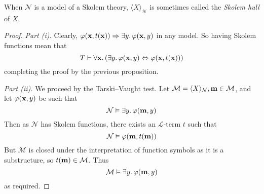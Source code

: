 \begin{remark}
    When \( \mathcal N \) is a model of a Skolem theory, \( \langle X \rangle_{\mathcal N} \) is sometimes called the \emph{Skolem hull} of \( X \).
\end{remark}
\begin{proof}
    \emph{Part (i).}
    Clearly, \( \varphi(\vb x, t(\vb x)) \Rightarrow \exists y.\, \varphi(\vb x, y) \) in any model.
    So having Skolem functions mean that
    \[ T \vdash \forall \vb x.\, (\exists y.\, \varphi(\vb x, y) \Leftrightarrow \varphi(\vb x, t(\vb x))) \]
    completing the proof by the previous proposition.

    \emph{Part (ii).}
    We proceed by the Tarski--Vaught test.
    Let \( \mathcal M = \langle X \rangle_{\mathcal N}, \vb m \in \mathcal M \), and let \( \varphi(\vb x, y) \) be such that
    \[ \mathcal N \vDash \exists y.\, \varphi(\vb m, y) \]
    Then as \( \mathcal N \) has Skolem functions, there exists an \( \mathcal L \)-term \( t \) such that
    \[ \mathcal N \vDash \varphi(\vb m, t(\vb m)) \]
    But \( \mathcal M \) is closed under the interpretation of function symbols as it is a substructure, so \( t(\vb m) \in \mathcal M \).
    Thus
    \[ \mathcal M \vDash \exists y.\, \varphi(\vb m, y) \]
    as required.
\end{proof}

